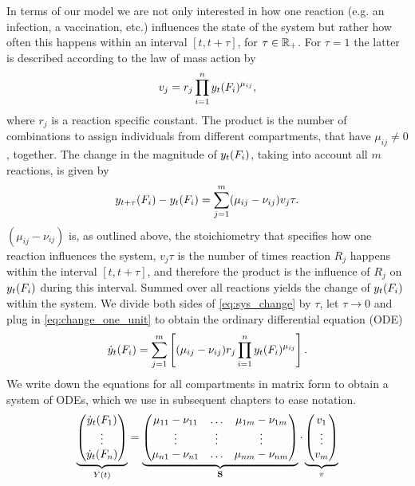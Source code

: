 In terms of our model we are not only interested in how one reaction (e.g. an infection, a vaccination, etc.) influences the state of the system but rather how often this happens within an interval $[t, t+\tau]$, for $\tau \in \mathbb{R}_+$. For $\tau = 1$ the latter is described according to the law of mass action by
\begin{align}
\label{eq:change_one_unit}
v_j = r_j  \prod_{i=1}^n y_t(F_i)^{\mu_{ij}},
\end{align}
where $r_j$ is a reaction specific constant. The product is the number of combinations to assign individuals from different compartments, that have $\mu_{ij} \neq 0$, together.
The change in the magnitude of $y_t(F_i)$, taking into account all $m$ reactions, is given by
\begin{align}
\label{eq:sys_change}
y_{t+\tau}(F_i) - y_t(F_i) = \sum_{j=1}^m (\mu_{ij} - \nu_{ij}) v_j \tau.
\end{align}
$(\mu_{ij} - \nu_{ij})$ is, as outlined above, the stoichiometry that specifies how one reaction influences the system, $v_j \tau$ is the number of times reaction $R_j$ happens within the interval $[t, t+\tau]$, and therefore the product is the influence of $R_j$ on $y_t(F_i)$ during this interval. Summed over all reactions yields the change of $y_t(F_i)$ within the system. We divide both sides of \eqref{eq:sys_change} by $\tau$, let $\tau \to 0$ and plug in \eqref{eq:change_one_unit} to obtain the ordinary differential equation (ODE)
\begin{align}
\dot{y}_t(F_i) = \sum_{j=1}^m \left[(\mu_{ij} - \nu_{ij}) r_j  \prod_{i=1}^n y_t(F_i)^{\mu_{ij}} \right].
\end{align}
We write down the equations for all compartments in matrix form to obtain a system of ODEs, which we use in subsequent chapters to ease notation.
\begin{align}
\label{eq:ode_system_matrix}
\underbrace{\begin{pmatrix}
\dot{y}_t(F_1) \\ \vdots \\ \dot{y}_t(F_n) \end{pmatrix}}_{Y(t)} =
\underbrace{\begin{pmatrix}
\mu_{11} - \nu_{11} & \hdots & \mu_{1m} - \nu_{1m} \\
\vdots & \vdots & \vdots \\
\mu_{n1} - \nu_{n1} & \hdots & \mu_{nm} - \nu_{nm} \\
\end{pmatrix}}_{\mathbf{S}} \cdot
\underbrace{\begin{pmatrix}
v_1 \\ \vdots \\ v_m
\end{pmatrix}}_{v}
\end{align}
